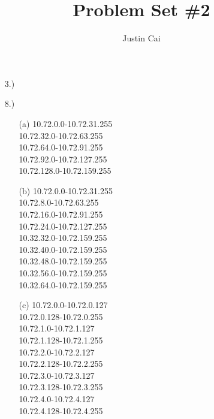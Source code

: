 \documentclass{article}
\title{Problem Set \#2}
\author{Justin Cai}
\begin{document}
    \maketitle
    \begin{enumerate}
        \item [3.)]

        \item [8.)]
        \begin{enumerate}
            
            \item [(a)]
            10.72.0.0-10.72.31.255\\
            10.72.32.0-10.72.63.255\\
            10.72.64.0-10.72.91.255\\
            10.72.92.0-10.72.127.255\\
            10.72.128.0-10.72.159.255\\

            \item [(b)]
            10.72.0.0-10.72.31.255\\
            10.72.8.0-10.72.63.255\\
            10.72.16.0-10.72.91.255\\
            10.72.24.0-10.72.127.255\\
            10.32.32.0-10.72.159.255\\
            10.32.40.0-10.72.159.255\\
            10.32.48.0-10.72.159.255\\
            10.32.56.0-10.72.159.255\\
            10.32.64.0-10.72.159.255\\

            \item [(c)]
            10.72.0.0-10.72.0.127\\
            10.72.0.128-10.72.0.255\\
            10.72.1.0-10.72.1.127\\
            10.72.1.128-10.72.1.255\\
            10.72.2.0-10.72.2.127\\
            10.72.2.128-10.72.2.255\\
            10.72.3.0-10.72.3.127\\
            10.72.3.128-10.72.3.255\\
            10.72.4.0-10.72.4.127\\
            10.72.4.128-10.72.4.255\\


        \end{enumerate}
    \end{enumerate}
    
\end{document}
